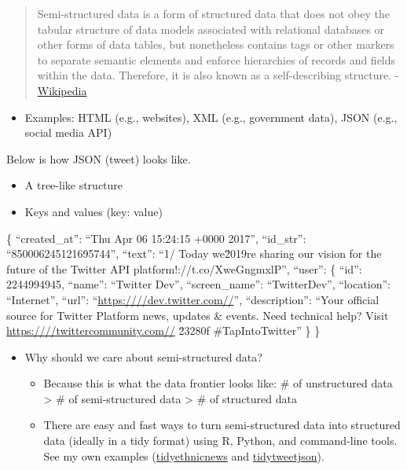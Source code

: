 \documentclass[
]{book}
\providecommand{\tightlist}{%
  \setlength{\itemsep}{0pt}\setlength{\parskip}{0pt}}
\begin{document}
\begin{quote}
Semi-structured data is a form of structured data that does not obey the tabular structure of data models associated with relational databases or other forms of data tables, but nonetheless contains tags or other markers to separate semantic elements and enforce hierarchies of records and fields within the data. Therefore, it is also known as a self-describing structure. - \href{https://en.wikipedia.org/wiki/Semi-structured_data\#:~:text=Semi\%2Dstructured\%20data\%20is\%20a,and\%20fields\%20within\%20the\%20data.}{Wikipedia}
\end{quote}

\begin{itemize}
\tightlist
\item
  Examples: HTML (e.g., websites), XML (e.g., government data), JSON (e.g., social media API)
\end{itemize}

Below is how JSON (tweet) looks like.

\begin{itemize}
\item
  A tree-like structure
\item
  Keys and values (key: value)
\end{itemize}

\{
``created\_at'': ``Thu Apr 06 15:24:15 +0000 2017'',
``id\_str'': ``850006245121695744'',
``text'': ``1/ Today we\u2019re sharing our vision for the future of the Twitter API platform!\nhttps://t.co/XweGngmxlP'',
``user'': \{
``id'': 2244994945,
``name'': ``Twitter Dev'',
``screen\_name'': ``TwitterDev'',
``location'': ``Internet'',
``url'': ``\url{https:////dev.twitter.com//}'',
``description'': ``Your official source for Twitter Platform news, updates \& events. Need technical help? Visit \url{https:////twittercommunity.com//} \u2328\ufe0f \#TapIntoTwitter''
\}
\}

\begin{itemize}
\item
  Why should we care about semi-structured data?

  \begin{itemize}
  \tightlist
  \item
    Because this is what the data frontier looks like: \# of unstructured data \textgreater{} \# of semi-structured data \textgreater{} \# of structured data
  \item
    There are easy and fast ways to turn semi-structured data into structured data (ideally in a tidy format) using R, Python, and command-line tools. See my own examples (\href{https://github.com/jaeyk/tidyethnicnews}{tidyethnicnews} and \href{https://github.com/jaeyk/tidytweetjson}{tidytweetjson}).
  \end{itemize}
\end{itemize}
\end{document}
